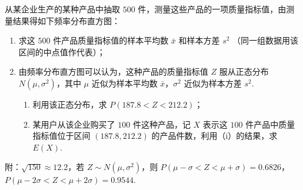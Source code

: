 \begin{problem}
从某企业生产的某种产品中抽取 \(500\) 件，测量这些产品的一项质量指标值，由测量结果得如下频率分布直方图：

\begin{enumerate}
\item 求这 \(500\) 件产品质量指标值的样本平均数 \( \bar{x} \) 和样本方差 \( s^{2} \) （同一组数据用该区间的中点值作代表）；
\item 由频率分布直方图可以认为，这种产品的质量指标值 \(Z\) 服从正态分布 \(N(\mu, \sigma^2)\)，其中 \(\mu\) 近似为样本平均数 \(\bar{x}\)，\(\sigma^2\) 近似为样本方差 \(s^2\).

\begin{enumerate}
\item 利用该正态分布，求 \( P(187.8 < Z < 212.2) \)；
\item 某用户从该企业购买了 \(100\) 件这种产品，记 \(X\) 表示这 \(100\) 件产品中质量指标值位于区间 \((187.8, 212.2)\) 的产品件数，利用（i）的结果，求 \(E(X)\).
\end{enumerate}
\end{enumerate}

附：\( \sqrt{150} \approx 12.2 \)，若 \( Z \sim N(\mu, \sigma^{2}) \)，则 \( P(\mu - \sigma < Z < \mu + \sigma) = 0.6826 \)，\( P(\mu - 2\sigma < Z < \mu + 2\sigma) = 0.9544 \).

\begin{center}
\end{center}
\FloatBarrier
\end{problem}


